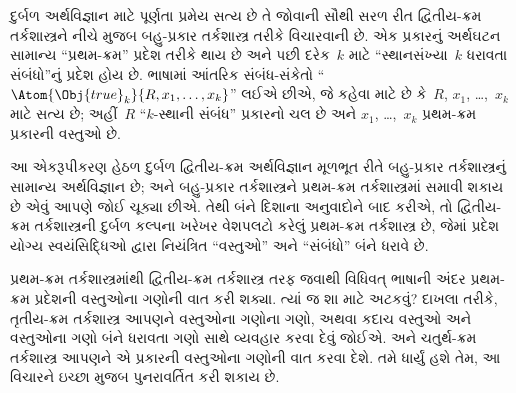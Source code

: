 દુર્બળ અર્થવિજ્ઞાન માટે પૂર્ણતા પ્રમેય સત્ય છે તે જોવાની સૌથી સરળ રીત
દ્વિતીય-ક્રમ તર્કશાસ્ત્રને નીચે મુજબ બહુ-પ્રકાર તર્કશાસ્ત્ર તરીકે
વિચારવાની છે. એક પ્રકારનું અર્થઘટન સામાન્ય ``પ્રથમ-ક્રમ'' પ્રદેશ
તરીકે થાય છે અને પછી દરેક~$k$ માટે ``સ્થાનસંખ્યા~$k$ ધરાવતા સંબંધો''નું
પ્રદેશ હોય છે. ભાષામાં આંતરિક સંબંધ-સંકેતો
``$\Atom{\Obj{true}_k}{R,x_1,\dots,x_k}$'' લઈએ છીએ, જે કહેવા માટે છે
કે~$R$, $x_1$, \dots,~$x_k$ માટે સત્ય છે; અહીં~$R$ ``$k$-સ્થાની
સંબંધ'' પ્રકારનો ચલ છે અને $x_1$, \dots,~$x_k$ પ્રથમ-ક્રમ પ્રકારની
વસ્તુઓ છે.

આ એકરૂપીકરણ હેઠળ દુર્બળ દ્વિતીય-ક્રમ અર્થવિજ્ઞાન મૂળભૂત રીતે બહુ-પ્રકાર
તર્કશાસ્ત્રનું સામાન્ય અર્થવિજ્ઞાન છે; અને બહુ-પ્રકાર તર્કશાસ્ત્રને
પ્રથમ-ક્રમ તર્કશાસ્ત્રમાં સમાવી શકાય છે એવું આપણે જોઈ ચૂક્યા છીએ. તેથી
બંને દિશાના અનુવાદોને બાદ કરીએ, તો દ્વિતીય-ક્રમ તર્કશાસ્ત્રની દુર્બળ
કલ્પના ખરેખર વેશપલટો કરેલું પ્રથમ-ક્રમ તર્કશાસ્ત્ર છે, જેમાં પ્રદેશ
યોગ્ય સ્વયંસિદ્ધિઓ દ્વારા નિયંત્રિત ``વસ્તુઓ'' અને ``સંબંધો'' બંને ધરાવે
છે.
\endgroup


\begingroup
\makeatletter{}\makeatother


\label{guunit:OLP-0178}


પ્રથમ-ક્રમ તર્કશાસ્ત્રમાંથી દ્વિતીય-ક્રમ તર્કશાસ્ત્ર તરફ જવાથી વિધિવત્
ભાષાની અંદર પ્રથમ-ક્રમ પ્રદેશની વસ્તુઓના ગણોની વાત કરી શક્યા.
ત્યાં જ શા માટે અટકવું? દાખલા તરીકે, તૃતીય-ક્રમ તર્કશાસ્ત્ર આપણને
વસ્તુઓના ગણોના ગણો, અથવા કદાચ વસ્તુઓ અને વસ્તુઓના ગણો બંને ધરાવતા ગણો
સાથે વ્યવહાર કરવા દેવું જોઈએ. અને ચતુર્થ-ક્રમ તર્કશાસ્ત્ર આપણને એ
પ્રકારની વસ્તુઓના ગણોની વાત કરવા દેશે. તમે ધાર્યું હશે તેમ, આ વિચારને
ઇચ્છા મુજબ પુનરાવર્તિત કરી શકાય છે.

